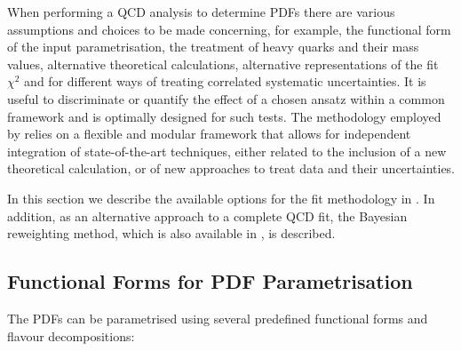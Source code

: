 


When performing a QCD analysis to determine PDFs there are various assumptions and choices to be made concerning, for example, the functional form of the input parametrisation, the treatment of heavy quarks and their mass values, alternative theoretical calculations, alternative representations of the fit $\chi^2$ and for different ways of treating correlated systematic uncertainties.
%
 It is useful to discriminate or quantify the effect of a chosen ansatz within a common framework and 
\fitter is optimally designed for such tests.
%
The methodology employed by \fitter  relies on a flexible and modular
framework that allows for independent integration of state-of-the-art techniques, either related to the inclusion of a new theoretical calculation, or of new approaches to treat data and their uncertainties. 

In this section we describe the available options for the fit methodology in \fitter.
%
In addition, as an alternative approach to a complete QCD fit, the Bayesian reweighting
method, which is also available in \fitter, is described.
\subsection{Functional Forms for PDF Parametrisation}
The PDFs can be parametrised using several predefined
functional forms and flavour decompositions:
